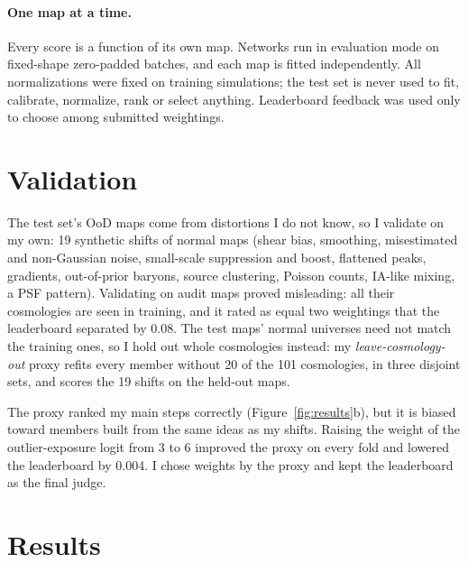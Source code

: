 \documentclass[10pt]{article}
\begin{document}
\paragraph{One map at a time.} Every score is a function of its own map. Networks run in evaluation mode on
fixed-shape zero-padded batches, and each map is fitted independently. All normalizations were fixed on training
simulations; the test set is never used to fit, calibrate, normalize, rank or select anything. Leaderboard feedback
was used only to choose among submitted weightings.

\section{Validation}

The test set's OoD maps come from distortions I do not know, so I validate on my own: 19 synthetic shifts of
normal maps (shear bias, smoothing, misestimated and non-Gaussian noise, small-scale suppression and boost, flattened
peaks, gradients, out-of-prior baryons, source clustering, Poisson counts, IA-like mixing, a PSF pattern).
Validating on audit maps proved misleading: all their cosmologies are seen in training, and it rated as equal two
weightings that the leaderboard separated by 0.08. The test maps' normal universes need not match the training
ones, so I hold out whole cosmologies instead: my \emph{leave-cosmology-out} proxy refits every member without 20
of the 101 cosmologies, in three disjoint sets, and scores the 19 shifts on the held-out maps.

The proxy ranked my main steps correctly (Figure~\ref{fig:results}b), but it is biased toward members built from
the same ideas as my shifts. Raising the weight of the outlier-exposure logit from 3 to 6 improved the proxy on
every fold and lowered the leaderboard by 0.004. I chose weights by the proxy and kept the leaderboard as the
final judge.

\section{Results}
\end{document}
